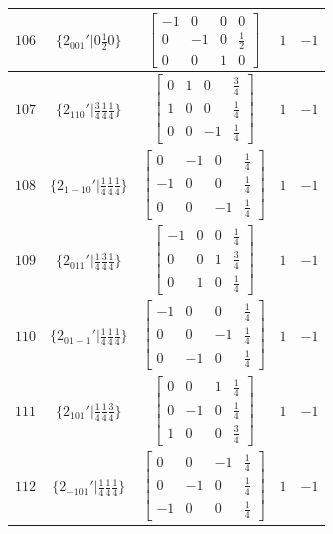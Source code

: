 \documentclass[fleqn,8pt]{jsarticle}
\begin{document}
\begin{longtable}{ccccc}
$ 106 $ & $ \{2{}_{001}{}'|0 \frac{1}{2} 0\} $ & $ \begin{bmatrix} -1 & 0 & 0 & 0 \\ 0 & -1 & 0 & \frac{1}{2} \\ 0 & 0 & 1 & 0 \end{bmatrix} $ & $ 1 $ & $ -1 $ \\ \hline
$ 107 $ & $ \{2{}_{110}{}'|\frac{3}{4} \frac{1}{4} \frac{1}{4}\} $ & $ \begin{bmatrix} 0 & 1 & 0 & \frac{3}{4} \\ 1 & 0 & 0 & \frac{1}{4} \\ 0 & 0 & -1 & \frac{1}{4} \end{bmatrix} $ & $ 1 $ & $ -1 $ \\ \hline
$ 108 $ & $ \{2{}_{1-10}{}'|\frac{1}{4} \frac{1}{4} \frac{1}{4}\} $ & $ \begin{bmatrix} 0 & -1 & 0 & \frac{1}{4} \\ -1 & 0 & 0 & \frac{1}{4} \\ 0 & 0 & -1 & \frac{1}{4} \end{bmatrix} $ & $ 1 $ & $ -1 $ \\ \hline
$ 109 $ & $ \{2{}_{011}{}'|\frac{1}{4} \frac{3}{4} \frac{1}{4}\} $ & $ \begin{bmatrix} -1 & 0 & 0 & \frac{1}{4} \\ 0 & 0 & 1 & \frac{3}{4} \\ 0 & 1 & 0 & \frac{1}{4} \end{bmatrix} $ & $ 1 $ & $ -1 $ \\ \hline
$ 110 $ & $ \{2{}_{01-1}{}'|\frac{1}{4} \frac{1}{4} \frac{1}{4}\} $ & $ \begin{bmatrix} -1 & 0 & 0 & \frac{1}{4} \\ 0 & 0 & -1 & \frac{1}{4} \\ 0 & -1 & 0 & \frac{1}{4} \end{bmatrix} $ & $ 1 $ & $ -1 $ \\ \hline
$ 111 $ & $ \{2{}_{101}{}'|\frac{1}{4} \frac{1}{4} \frac{3}{4}\} $ & $ \begin{bmatrix} 0 & 0 & 1 & \frac{1}{4} \\ 0 & -1 & 0 & \frac{1}{4} \\ 1 & 0 & 0 & \frac{3}{4} \end{bmatrix} $ & $ 1 $ & $ -1 $ \\ \hline
$ 112 $ & $ \{2{}_{-101}{}'|\frac{1}{4} \frac{1}{4} \frac{1}{4}\} $ & $ \begin{bmatrix} 0 & 0 & -1 & \frac{1}{4} \\ 0 & -1 & 0 & \frac{1}{4} \\ -1 & 0 & 0 & \frac{1}{4} \end{bmatrix} $ & $ 1 $ & $ -1 $ \\ \hline

\end{longtable}
\end{document}
